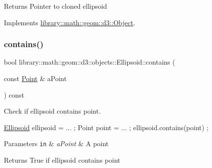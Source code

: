 \begin{DoxyReturn}{Returns}
Pointer to cloned ellipsoid 
\end{DoxyReturn}


Implements \hyperlink{classlibrary_1_1math_1_1geom_1_1d3_1_1_object_a1a784c6b359e0eb97cd34fabc42f2f3f}{library\+::math\+::geom\+::d3\+::\+Object}.

\mbox{\label{classlibrary_1_1math_1_1geom_1_1d3_1_1objects_1_1_ellipsoid_ae54cb74c4e6445988ac4d78e00288dd2}} 
\subsubsection{\texorpdfstring{contains()}{contains()}\hspace{0.1cm}{\footnotesize\ttfamily [1/3]}}
{\footnotesize\ttfamily bool library\+::math\+::geom\+::d3\+::objects\+::\+Ellipsoid\+::contains (\begin{DoxyParamCaption}\item[{const \hyperlink{classlibrary_1_1math_1_1geom_1_1d3_1_1objects_1_1_point}{Point} \&}]{a\+Point }\end{DoxyParamCaption}) const}



Check if ellipsoid contains point. 


\begin{DoxyCode}
\hyperlink{classlibrary_1_1math_1_1geom_1_1d3_1_1objects_1_1_ellipsoid_aae81fe0edc7f0e8d4590ea89ae73cb14}{Ellipsoid} ellipsoid = ... ;
Point point = ... ;
ellipsoid.contains(point) ;
\end{DoxyCode}



\begin{DoxyParams}[1]{Parameters}
\mbox{\tt in}  & {\em a\+Point} & A point \\
\hline
\end{DoxyParams}
\begin{DoxyReturn}{Returns}
True if ellipsoid contains point 
\end{DoxyReturn}
\mbox{\label{classlibrary_1_1math_1_1geom_1_1d3_1_1objects_1_1_ellipsoid_af539fe9e2be122e3f994a48e7d308fd0}} 
